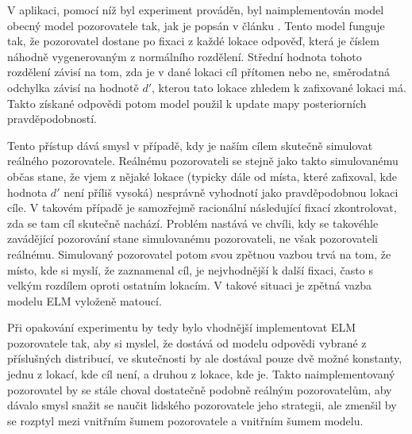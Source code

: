 V aplikaci, pomocí níž byl experiment prováděn, byl naimplementován model obecný
model pozorovatele tak, jak je popsán v článku \citep{Najemnik05}. Tento model
funguje tak, že pozorovatel dostane po fixaci z každé lokace odpověď, která je
číslem náhodně vygenerovaným z normálního rozdělení. Střední hodnota tohoto
rozdělení závisí na tom, zda je v dané lokaci cíl přítomen nebo ne, směrodatná
odchylka závisí na hodnotě $d'$, kterou tato lokace zhledem k zafixované lokaci
má. Takto získané odpovědi potom model použil k update mapy posteriorních
pravděpodobností.

Tento přístup dává smysl v případě, kdy je naším cílem skutečně simulovat
reálného pozorovatele. Reálnému pozorovateli se stejně jako takto simulovanému
občas stane, že vjem z nějaké lokace (typicky dále od místa, které zafixoval,
kde hodnota $d'$ není příliš vysoká) nesprávně vyhodnotí jako pravděpodobnou lokaci
cíle. V takovém případě je samozřejmě racionální následující fixací
zkontrolovat, zda se tam cíl skutečně nachází. Problém nastává ve chvíli, kdy
se takovéhle zavádějící pozorování stane simulovanému pozorovateli, ne však
pozorovateli reálnému. Simulovaný pozorovatel potom svou zpětnou vazbou trvá na
tom, že místo, kde si myslí, že zaznamenal cíl, je nejvhodnější k další fixaci,
často s velkým rozdílem oproti ostatním lokacím. V takové situaci je zpětná
vazba modelu ELM vyloženě matoucí. 

Při opakování experimentu by tedy bylo vhodnější implementovat ELM pozorovatele
tak, aby si myslel, že dostává od modelu odpovědi vybrané z příslušných
distribucí, ve skutečnosti by ale dostával pouze dvě možné konstanty, jednu z
lokací, kde cíl není, a druhou z lokace, kde je. Takto naimplementovaný
pozorovatel by se stále choval dostatečně podobně reálným pozorovatelům, aby
dávalo smysl snažit se naučit lidského pozorovatele jeho strategii, ale zmenšil
by se rozptyl mezi vnitřním šumem pozorovatele a vnitřním šumem modelu.


